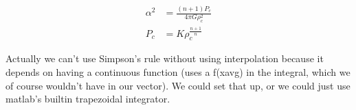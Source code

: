 \documentclass{article}
\begin{document}
        \begin{align*}
            \alpha^2&=\frac{(n+1)P_c}{4\pi G\rho_c^2} \\
            P_c&=K\rho_c^{\frac{n+1}{n}}
        \end{align*}

        Actually we can't use Simpson's rule without using interpolation because
        it depends on having a continuous function (uses a f(xavg) in the
        integral, which we of course wouldn't have in our vector). We could set
        that up, or we could just use matlab's builtin trapezoidal integrator.
\end{document}
